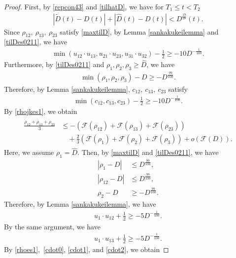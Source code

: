 \documentclass[reqno]{amsart}
\theoremstyle{plain}
\theoremstyle{definition}
\numberwithin{equation}{section}
\newcommand{\1}{\mathbbm{1}}
\begin{document}
\begin{proof}
First, by \eqref{repcon43} and \eqref{tilhatD}, we have for $T_1\leq t<T_2$
\begin{align}\label{tilDes0211}
\left| \tilde{D}(t)-D(t)\right|+\left|\hat{D}(t)-D(t)\right|<D^{\frac{19}{20}}(t).
\end{align}
Since $\rho_{12},\ \rho_{13},\ \rho_{23}$ satisfy \eqref{maxtilD}, by Lemma \ref{sankakukeilemma} and \eqref{tilDes0211}, we have
\begin{align*}
\min{(u_{12}\cdot u_{13},u_{21}\cdot u_{23},u_{31}\cdot u_{32})}-\frac{1}{2}\geq -10D^{-\frac{1}{100}}.
\end{align*}
Furthermore, by \eqref{tilDes0211} and $\rho_1,\rho_2,\rho_3\geq \hat{D}$, we have
\begin{align*}
\min{(\rho_1,\rho_2,\rho_3)}-D\geq -D^{\frac{99}{100}}.
\end{align*}
Therefore, by Lemma \ref{sankakukeilemma}, $c_{12},\ c_{13},\ c_{23}$ satisfy
\begin{align}\label{cdot0}
\min{(c_{12},c_{13},c_{23})}-\frac{1}{2}\geq -10D^{-\frac{1}{100}}.
\end{align}
By \eqref{rhojkes1}, we obtain
\begin{align}\label{avees1}
\begin{aligned}
\frac{\dot{\rho}_{12}+\dot{\rho}_{13}+\dot{\rho}_{23}}{3}&\leq -\left(\mathcal{F}(\rho_{12})+\mathcal{F}(\rho_{13})+\mathcal{F}(\rho_{23})\right)
\\
&\quad+\frac{2}{3}\left(\mathcal{F}(\rho_1)+\mathcal{F}(\rho_2)+\mathcal{F}(\rho_3)\right)+o(\mathcal{F}(D)).
\end{aligned}
\end{align}
Here, we assume $\rho_1=\hat{D}$. Then, by \eqref{maxtilD} and \eqref{tilDes0211}, we have 
\begin{align*}
|\rho_1-D|&\leq D^{\frac{99}{100}},
\\
|\rho_{12}-D|&\leq D^{\frac{99}{100}},
\\
\rho_2-D&\geq -D^{\frac{99}{100}}.
\end{align*}
Therefore, by Lemma \ref{sankakukeilemma}, we have
\begin{align}\label{cdot1}
u_1\cdot u_{12}+\frac{1}{2}\geq -5D^{-\frac{1}{100}}.
\end{align}
By the same argument, we have
\begin{align}\label{cdot2}
u_1\cdot u_{13}+\frac{1}{2}\geq -5D^{-\frac{1}{100}}.
\end{align}
By \eqref{rhoes1},\ \eqref{cdot0}, \eqref{cdot1}, and \eqref{cdot2}, we obtain

\end{proof}
\end{document}
